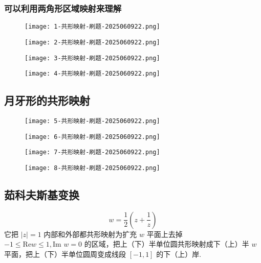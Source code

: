 \subsubsection{可以利用两角形区域映射来理解}

\begin{figure}[H]
\centering
\texttt{[image: 1-共形映射-刷题-2025060922.png]}
\label{}
\end{figure}

\begin{figure}[H]
\centering
\texttt{[image: 2-共形映射-刷题-2025060922.png]}
\label{}
\end{figure}
\begin{figure}[H]
\centering
\texttt{[image: 3-共形映射-刷题-2025060922.png]}
\label{}
\end{figure}
\begin{figure}[H]
\centering
\texttt{[image: 4-共形映射-刷题-2025060922.png]}
\label{}
\end{figure}

\subsection{月牙形的共形映射}

\begin{figure}[H]
\centering
\texttt{[image: 5-共形映射-刷题-2025060922.png]}
\label{}
\end{figure}
\begin{figure}[H]
\centering
\texttt{[image: 6-共形映射-刷题-2025060922.png]}
\label{}
\end{figure}
\begin{figure}[H]
\centering
\texttt{[image: 7-共形映射-刷题-2025060922.png]}
\label{}
\end{figure}
\begin{figure}[H]
\centering
\texttt{[image: 8-共形映射-刷题-2025060922.png]}
\label{}
\end{figure}

\subsection{茹科夫斯基变换}
\[
w=\frac{1}{2}\left( z+\frac{1}{z} \right)
\]
它把 $\lvert z \rvert=1$ 内部和外部都共形映射为扩充 $w$ 平面上去掉 $-1\leq \mathrm{Re}w\leq1,\text{Im }w=0$ 的区域，把上（下）半单位圆共形映射成下（上）半 $w$ 平面，把上（下）半单位圆周变成线段 $[-1,1]$ 的下（上）岸.

